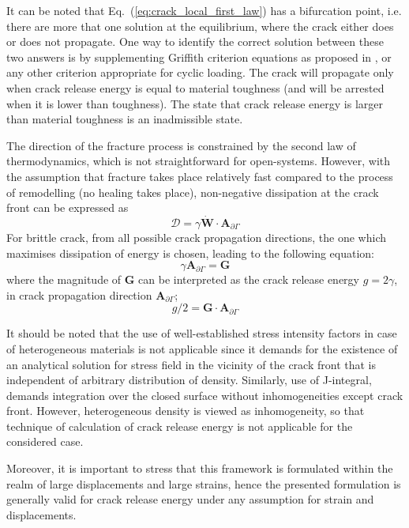 \documentclass[11pt]{acmeArticle}
\numberwithin{equation}{section}
\begin{document}
It can be noted that Eq.~(\ref{eq:crack_local_first_law}) has a
bifurcation point, i.e. there are more that one solution at the equilibrium, where the crack either
does or does not propagate. One way to identify the correct solution between these two answers is by
supplementing Griffith criterion equations as proposed in
\citep{kaczmarczyk2017energy}, or any other criterion appropriate for cyclic loading.
The crack will propagate only when crack release energy is equal to material
toughness (and will be arrested when it is lower than toughness). The state 
that crack release energy is larger than material toughness is an inadmissible state.

The direction of the fracture process is
constrained by the second law of thermodynamics, which is not straightforward for
open-systems. However, with the assumption that fracture takes place
relatively fast compared to the process of remodelling (no healing takes
place), non-negative dissipation at the crack front can be expressed as
\begin{equation}
	\mathcal{D} = \gamma \dot{\mathbf{W}} \cdot \mathbf{A}_{\partial\Gamma}
\end{equation}
For brittle crack, from all possible crack propagation directions, the one which
maximises dissipation of energy is chosen, leading to the following equation:
\begin{equation}
	\gamma \mathbf{A}_{\partial\Gamma} = \mathbf{G}
\end{equation} 
where the magnitude of $\mathbf{G}$ can be interpreted as the crack release
energy $g = 2\gamma$, in crack propagation direction $\mathbf{A}_{\partial\Gamma}$;
	\begin{equation}
	 g/2 = \mathbf{G} \cdot \mathbf{A}_{\partial\Gamma}
\end{equation}

It should be noted that the use of well-established stress intensity factors in case of
heterogeneous materials is not applicable since it demands for the existence of
an analytical solution for stress field in the vicinity of the crack front that is
independent of arbitrary distribution of density. Similarly, use of
J-integral, demands integration over the closed surface without
inhomogeneities except crack front. However, heterogeneous density is viewed as
inhomogeneity, so that technique of calculation of crack release energy is
not applicable for the considered case. 

Moreover, it is important to stress that this framework is formulated within 
the realm of large displacements and large strains, hence the presented formulation 
is generally valid for crack release energy under any assumption for strain and displacements.
\end{document}
